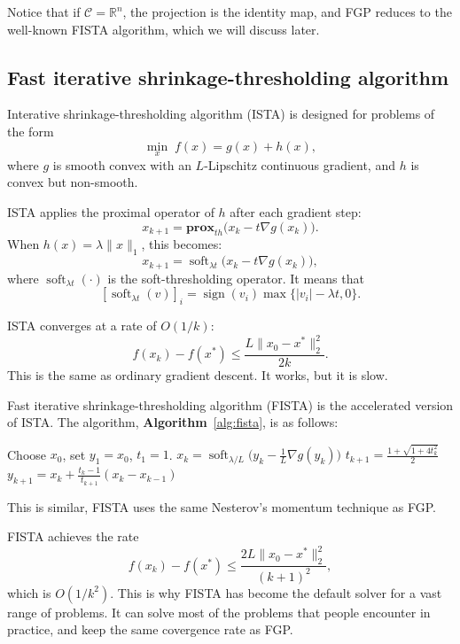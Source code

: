 \documentclass[lang=en,color=blue,mode=fancy,titlestyle=hang]{elegantbook}
\newcommand{\algoref}[1]{\textbf{Algorithm}~\ref{#1}}
\begin{document}
Notice that if $\mathcal{C} = \mathbb{R}^n$, the projection is the identity map, and FGP reduces to
the well-known FISTA algorithm, which we will discuss later.

\subsection{Fast iterative shrinkage-thresholding algorithm}

Interative shrinkage-thresholding algorithm (ISTA) is designed for problems of the form
\[
\min_{x} \; f(x) = g(x) + h(x),
\]
where $g$ is smooth convex with an $L$-Lipschitz continuous gradient, and $h$ is convex but non-smooth.

ISTA applies the proximal operator of $h$ after each gradient step:
\[
x_{k+1} = \mathbf{prox}_{t h}\bigl( x_k - t \nabla g(x_k) \bigr).
\]
When $h(x) = \lambda \|x\|_1$, this becomes:
\[
x_{k+1} = \operatorname{soft}_{\lambda t}\bigl( x_k - t \nabla g(x_k) \bigr),
\]
where $\operatorname{soft}_{\lambda t}(\cdot)$ is the soft-thresholding operator. It means that
\[
[\operatorname{soft}_{\lambda t}(v)]_i = \operatorname{sign}(v_i) \max\{|v_i| - \lambda t, 0\}.
\]

ISTA converges at a rate of $O(1/k)$:
\[
f(x_k) - f(x^*) \le \frac{L \|x_0 - x^*\|_2^2}{2k}.
\]
This is the same as ordinary gradient descent. It works, but it is slow.

Fast iterative shrinkage-thresholding algorithm (FISTA) is the accelerated version of ISTA. The
algorithm, \algoref{alg:fista}, is as follows:

\begin{algorithm}[H]
\caption{Fast Iterative Shrinkage-Thresholding Algorithm}
\label{alg:fista}
\begin{algorithmic}
\State Choose $x_0$, set $y_1 = x_0$, $t_1 = 1$.
  \State $x_k = \operatorname{soft}_{\lambda/L}\bigl( y_k - \frac{1}{L} \nabla g(y_k) \bigr)$
  \State $t_{k+1} = \frac{1 + \sqrt{1 + 4t_k^2}}{2}$
  \State $y_{k+1} = x_k + \frac{t_k - 1}{t_{k+1}} (x_k - x_{k-1})$
\EndFor
\end{algorithmic}
\end{algorithm}

This is similar, FISTA uses the same Nesterov's momentum technique as FGP.

FISTA achieves the rate
\[
f(x_k) - f(x^*) \le \frac{2L \|x_0 - x^*\|_2^2}{(k+1)^2},
\]
which is $O(1/k^2)$. This is why FISTA has become the default solver for a vast range of problems.
It can solve most of the problems that people encounter in practice, and keep the same covergence
rate as FGP.
\end{document}
